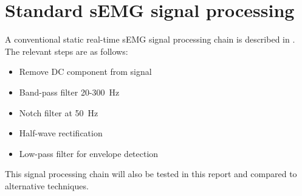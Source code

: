 \section{Standard sEMG signal processing}\label{section:standard_semg_processing}
A conventional static real-time sEMG signal processing chain is described in \cite{muscle_force_estimation}. The relevant steps are as follows:
\begin{itemize}
    \item Remove DC component from signal
    \item Band-pass filter 20-\SI{300}{\hertz}
    \item Notch filter at \SI{50}{\hertz}
    \item Half-wave rectification
    \item Low-pass filter for envelope detection
\end{itemize}

This signal processing chain will also be tested in this report and compared to alternative techniques.